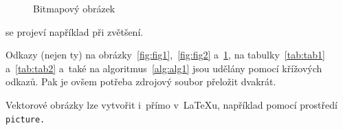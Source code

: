 \documentclass[a4paper, 11pt]{article}
\begin{document}
\begin{figure}[h]
    \centering
    \caption{Bitmapový obrázek}
    \label{fig:fig3}
\end{figure}
\bigskip\noindent se projeví například při zvětšení.

Odkazy (nejen ty) na obrázky~\ref{fig:fig1},~\ref{fig:fig2} a~\ref{fig:fig3}, na tabulky~\ref{tab:tab1} a~\ref{tab:tab2} a~také na algoritmus~\ref{alg:alg1} jsou udělány pomocí křížových odkazů. Pak je ovšem potřeba zdrojový soubor přeložit dvakrát.

Vektorové obrázky lze vytvořit i~přímo v~\LaTeX u, například pomocí prostředí\texttt{ picture.}
\pagebreak
\end{document}
